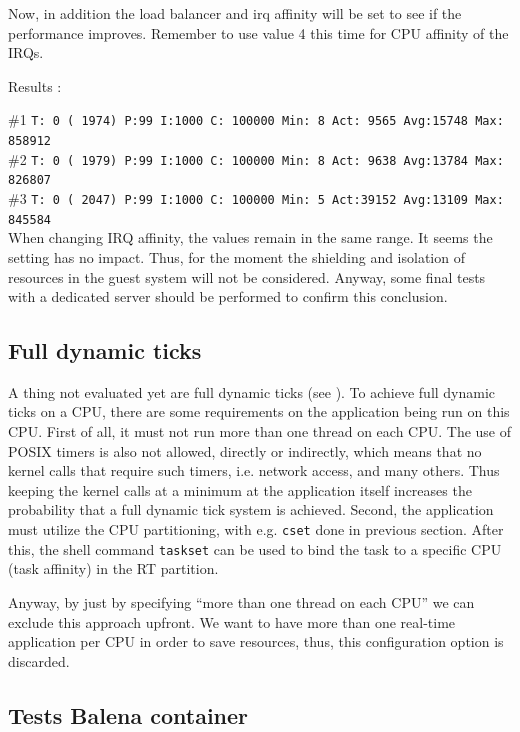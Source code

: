 \documentclass[]{scrartcl}
\begin{document}
Now, in addition the load balancer and irq affinity will be set to see if the performance improves. Remember to use value 4 this time for CPU affinity of the IRQs.
\bigskip

\noindent Results :

\noindent \#1 \small \texttt{T: 0 ( 1974) P:99 I:1000 C: 100000 Min:      8 Act: 9565 Avg:15748 Max:  858912}\\
\noindent \#2 \small \texttt{T: 0 ( 1979) P:99 I:1000 C: 100000 Min:      8 Act: 9638 Avg:13784 Max:  826807}\\
\noindent \#3 \small \texttt{T: 0 ( 2047) P:99 I:1000 C: 100000 Min:      5 Act:39152 Avg:13109 Max:  845584}\\

When changing IRQ affinity, the values remain in the same range. It seems the setting has no impact. Thus, for the moment the shielding and isolation of resources in the guest system will not be considered. 
Anyway, some final tests with a dedicated server should be performed to confirm this conclusion.

\subsection{Full dynamic ticks}

A thing not evaluated yet are full dynamic ticks (see \cite{lrt02}). To achieve full dynamic ticks on a CPU, there are some requirements on the application being run on this CPU. First of all, it must not run more than one thread on each CPU. The use of POSIX timers is also not allowed, directly or indirectly, which means that no kernel calls that require such timers, i.e. network access, and many others. Thus keeping the kernel calls at a minimum at the application itself increases the probability that a full dynamic tick system is achieved.
Second, the application must utilize the CPU partitioning, with e.g. \texttt{cset} done in previous section. After this, the shell command \texttt{taskset} can be used to bind the task to a specific CPU (task affinity) in the RT partition.

Anyway, by just by specifying ``more than one thread on each CPU'' we can exclude this approach upfront. We want to have more than one real-time application per CPU in order to save resources, thus, this configuration option is discarded.

\subsection{Tests Balena container}
\end{document}
